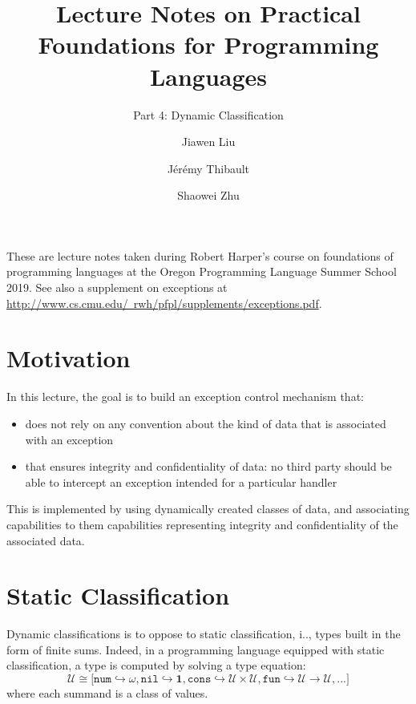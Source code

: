 \documentclass[ manuscript,screen, nonacm]{acmart}
\begin{document}
\author{Jiawen Liu}

\author{J\'er\'emy Thibault}

\author{Shaowei Zhu}

\title{Lecture Notes on Practical Foundations for Programming Languages}
\subtitle{Part 4: Dynamic Classification}

\maketitle

These are lecture notes taken during Robert Harper's course on foundations of
programming languages at the Oregon Programming Language Summer School 2019.
See also a  supplement on exceptions at \href{http://www.cs.cmu.edu/~rwh/pfpl/supplements/exceptions.pdf}{http://www.cs.cmu.edu/~rwh/pfpl/supplements/exceptions.pdf}.

\section{Motivation}

In this lecture, the goal is to build an exception control mechanism that:
\begin{itemize}
    \item does not rely on any convention about the kind of data that is associated
    with an exception
    \item that ensures integrity and confidentiality of data: no third party should be able
    to intercept an exception intended for a particular handler
\end{itemize}

This is implemented by using dynamically created classes of data, and associating
capabilities to them capabilities representing integrity and confidentiality of the
associated data.

\section{Static Classification}
Dynamic classifications is to oppose to static classification, i.\@e\@., types built in the form of finite sums.
Indeed, in a programming language equipped with static classification, 
a type is computed by solving a type equation: 
\[
\mathcal{U} \cong \big[
\mathtt{num} \hookrightarrow \omega, 
\mathtt{nil} \hookrightarrow \mathbf{1}, 
\mathtt{cons} \hookrightarrow \mathcal{U} \times \mathcal{U}, 
\mathtt{fun} \hookrightarrow \mathcal{U} \rightarrow \mathcal{U}, ...
\big] 
\]
where each summand is a class of values.
\end{document}
